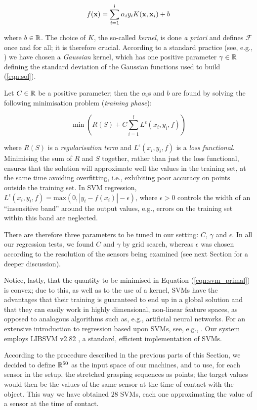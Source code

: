 \begin{equation} \label{eqn:sol}
  f(\mathbf{x}) = \sum_{i=1}^l \alpha_i y_i K(\mathbf{x},\mathbf{x}_i) + b
\end{equation}

\noindent where $b \in \mathbb{R}$. The choice of $K$, the so-called
\emph{kernel}, is done \emph{a priori} and defines $\mathcal{F}$ once and for
all; it is therefore crucial. According to a standard practice (see,
e.g., \cite{Cristianini00}) we have chosen a \emph{Gaussian} kernel,
which has one positive parameter $\gamma \in \mathbb{R}$ defining the
standard deviation of the Gaussian functions used to build
(\ref{eqn:sol}).

Let $C \in \mathbb{R}$ be a positive parameter; then the $\alpha_i$s and $b$
are found by solving the following minimisation problem
(\emph{training phase}):

\begin{equation} \label{eqn:svm_primal}
  \min \left( R(S) + C \sum_{i=1}^l L^\epsilon (x_i,y_i,f) \right)
\end{equation}

\noindent where $R(S)$ is a \emph{regularisation term} and
$L^\epsilon (x_i,y_i,f)$ is a \emph{loss functional}. Minimising the
sum of $R$ and $S$ together, rather than just the loss functional,
ensures that the solution will approximate well the values in the
training set, at the same time avoiding overfitting, i.e., exhibiting
poor accuracy on points outside the training set. In SVM regression,
$L^\epsilon (x_i,y_i,f) = \mbox{max}(0,|y_i-f(x_i)|-\epsilon)$,
where $\epsilon > 0$ controls the width of an ``insensitive band'' around
the output values, e.g., errors on the training set within this band
are neglected.

There are therefore three parameters to be tuned in our setting:
$C$, $\gamma$ and $\epsilon$. In all our regression tests, we found
$C$ and $\gamma$ by grid search, whereas $\epsilon$ was chosen
according to the resolution of the sensors being examined (see next
Section for a deeper discussion).

Notice, lastly, that the quantity to be minimised in Equation
(\ref{eqn:svm_primal}) is convex; due to this, as well as to the use
of a kernel, SVMs have the advantages that their training is
guaranteed to end up in a global solution and that they can easily
work in highly dimensional, non-linear feature spaces, as opposed to
analogous algorithms such as, e.g., artificial neural networks. For an
extensive introduction to regression based upon SVMs, see, e.g.,
\cite{SmolaTut2004}. Our system employs LIBSVM v2.82 \cite{ChangL01},
a standard, efficient implementation of SVMs.

According to the procedure described in the previous parts of this
Section, we decided to define $\mathbb{R}^{50}$ as the input space of our
machines, and to use, for each sensor in the setup, the stretched
grasping sequences as points; the target values would then be the
values of the same sensor at the time of contact with the object. This
way we have obtained $28$ SVMs, each one approximating the value of a
sensor at the time of contact.
